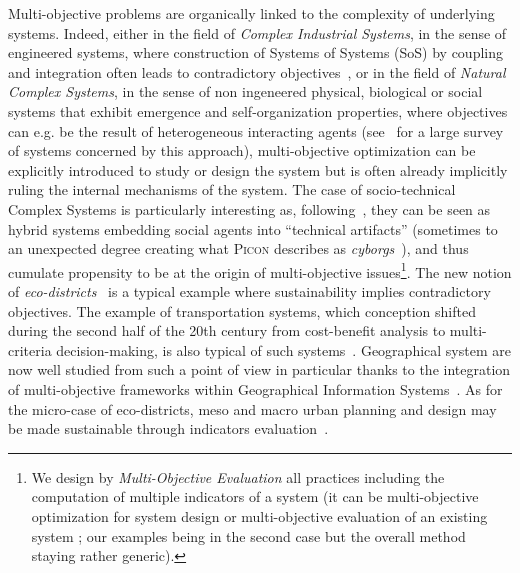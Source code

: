 \documentclass[runningheads,a4paper]{llncs2e/llncs}
\newcommand{\noun}[1]{\textsc{#1}}
\begin{document}
Multi-objective problems are organically linked to the complexity of underlying systems. Indeed, either in the field of \emph{Complex Industrial Systems}, in the sense of engineered systems, where construction of Systems of Systems (SoS) by coupling and integration often leads to contradictory objectives~\cite{marler2004survey}, or in the field of \emph{Natural Complex Systems}, in the sense of non ingeneered  physical, biological or social systems that exhibit emergence and self-organization properties, where objectives can e.g. be the result of heterogeneous interacting agents (see~\cite{newman2011complex} for a large survey of systems concerned by this approach), multi-objective optimization can be explicitly introduced to study or design the system but is often already implicitly ruling the internal mechanisms of the system. The case of socio-technical Complex Systems is particularly interesting as, following~\cite{haken2003face}, they can be seen as hybrid systems embedding social agents into ``technical artifacts'' (sometimes to an unexpected degree creating what \noun{Picon} describes as \emph{cyborgs}~\cite{picon2013smart}), and thus cumulate propensity to be at the origin of multi-objective issues\footnote{We design by \emph{Multi-Objective Evaluation} all practices including the computation of multiple indicators of a system (it can be multi-objective optimization for system design or multi-objective evaluation of an existing system ; our examples being in the second case but the overall method staying rather generic).}. The new notion of \emph{eco-districts}~\cite{souami2012ecoquartiers} is a typical example where sustainability implies contradictory objectives. The example of transportation systems, which conception shifted during the second half of the 20th century from cost-benefit analysis to multi-criteria decision-making, is also typical of such systems~\cite{bavoux2005geographie}. Geographical system are now well studied from such a point of view in particular thanks to the integration of multi-objective frameworks within Geographical Information Systems~\cite{carver1991integrating}. As for the micro-case of eco-districts, meso and macro urban planning and design may be made sustainable through indicators evaluation~\cite{jegou2012evaluation}.
\end{document}
